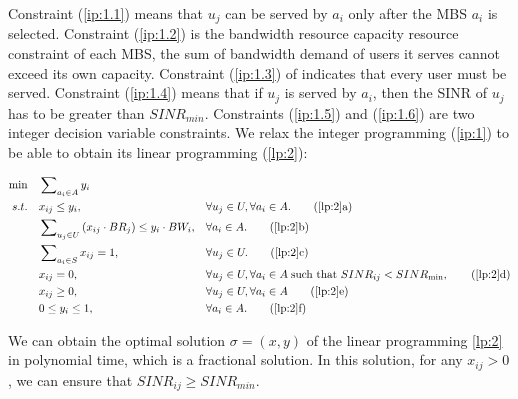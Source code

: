 \documentclass[11pt,a4paper]{article}
\begin{document}
Constraint (\ref{ip:1.1}) means that $u_j$ can be served by $a_i$ only after the MBS $a_i$ is selected. Constraint (\ref{ip:1.2}) is the bandwidth resource capacity resource constraint of each MBS, the sum of bandwidth demand of users it serves cannot exceed its own capacity. Constraint (\ref{ip:1.3}) of indicates that every user must be served. Constraint (\ref{ip:1.4}) means that if $u_j$ is served by $a_i$, then the SINR of $u_j$ has to be greater than $SINR_{min}$. Constraints (\ref{ip:1.5}) and (\ref{ip:1.6}) are two integer decision variable constraints. We relax the integer programming (\ref{ip:1}) to be able to obtain its linear programming (\ref{lp:2}):

\begin{align}
	\min \quad & \sum\nolimits_{{a_i} \in A} {{y_i}}&&  \label{lp:2}\\
	s.t.\quad &  {x_{ij}} \le {y_i},&&\forall {u_j} \in U,\forall {a_i} \in A. \tag{\ref{lp:2}{a}}\label{lp:2.1}\\
	&  \sum\nolimits_{{u_j} \in U} {({x_{ij}} \cdot B{R_j})}  \le {y_i} \cdot B{W_i},&&\forall {a_i} \in A. \tag{\ref{lp:2}{b}}\label{lp:2.2}\\
	&  \sum\nolimits_{{a_i} \in S} {{x_{ij}}}  = 1,&&\forall {u_j} \in U. \tag{\ref{lp:2}{c}}\label{lp:2.3}\\
	&  {x_{ij}} = 0,&&\forall {u_j} \in U,\forall {a_i} \in A\;{\text{such that }}SIN{R_{ij}} < SIN{R_{\min }}, \tag{\ref{lp:2}{d}}\label{lp:2.4}\\
	&  {x_{ij}} \ge 0,&&\forall u_j \in U,\forall {a_i} \in A \tag{\ref{lp:2}{e}}\label{lp:2.5}\\
	&  0 \le {y_i} \le 1,&&\forall {a_i} \in A. \tag{\ref{lp:2}{f}}\label{lp:2.6}
\end{align}

We can obtain the optimal solution $\sigma=(x,y)$ of the linear programming \ref{lp:2} in polynomial time, which is a fractional solution. In this solution, for any $x_{ij}>0$ , we can ensure that $SINR_{ij}\ge SINR_{min}$.
\end{document}
